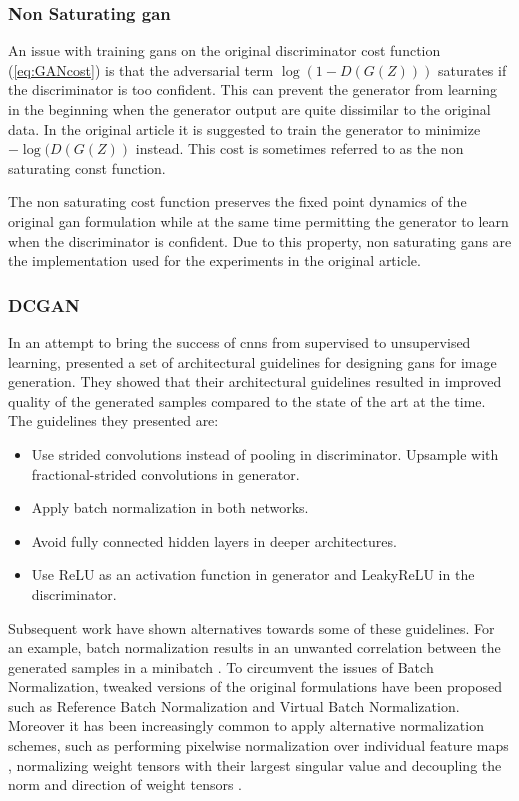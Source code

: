 \subsubsection{Non Saturating \acrshort{gan}} 
An issue with training \acrshort{gans} on the original discriminator cost function (\ref{eq:GANcost}) is that the adversarial term $\log(1-D(G(Z)))$ saturates if the discriminator is too confident. This can prevent the generator from learning in the beginning when the generator output are quite dissimilar to the original data. In the original article it is suggested to train the generator to minimize $-\log(D(G(Z))$ instead. This cost is sometimes referred to as the non saturating const function.

The non saturating cost function preserves the fixed point dynamics of the original \acrshort{gan} formulation while at the same time permitting the generator to learn when the discriminator is confident. Due to this property, non saturating \acrshort{gans} are the implementation used for the experiments in the original article.

\subsubsection{DCGAN}
In an attempt to bring the success of \acrfull{cnns} from supervised to unsupervised learning, \textcite{radfordMC152015} presented a set of architectural guidelines for designing \acrshort{gans} for image generation. They showed that their architectural guidelines resulted in improved quality of the generated samples compared to the state of the art at the time. The guidelines they presented are:

\begin{itemize}
    \item Use strided convolutions instead of pooling in discriminator. Upsample with fractional-strided convolutions in generator.
    \item Apply batch normalization \parencite{ioffeS15batchnorm} in both networks.
    \item Avoid fully connected hidden layers in deeper architectures.
    \item Use ReLU as an activation function in generator and LeakyReLU \parencite{maas2013rectifier} in the discriminator.
\end{itemize}

Subsequent work have shown alternatives towards some of these guidelines. For an example, batch normalization results in an unwanted correlation between the generated samples in a minibatch \parencite{salimans2016improved}. To circumvent the issues of Batch Normalization, tweaked versions of the original formulations have been proposed such as Reference Batch Normalization and Virtual Batch Normalization. Moreover it has been increasingly common to apply alternative normalization schemes, such as performing pixelwise normalization over individual feature maps \parencite{karras2017progressive}, normalizing weight tensors with their largest singular value \parencite{miyato2017spectral} and decoupling the norm and direction of weight tensors \parencite{NIPS2016weightnorm, xiang2017effects}.

